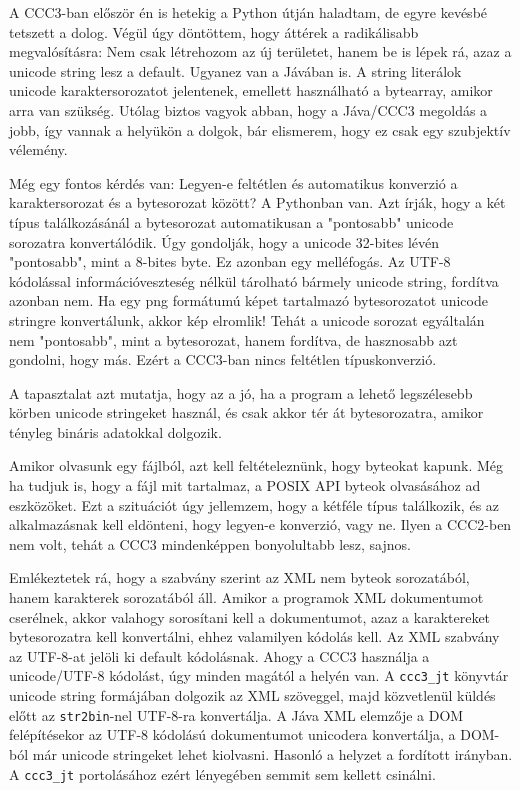 A CCC3-ban először én is hetekig a Python útján haladtam,
de egyre kevésbé tetszett a dolog. Végül úgy döntöttem,
hogy áttérek a radikálisabb megvalósításra: Nem csak létrehozom
az új területet, hanem be is lépek rá, azaz a unicode string
lesz a default. Ugyanez van a Jávában is. A string literálok
unicode karaktersorozatot jelentenek, emellett használható a
bytearray, amikor arra van szükség. Utólag biztos vagyok
abban, hogy a Jáva/CCC3 megoldás a jobb, így vannak a helyükön
a dolgok, bár elismerem, hogy ez csak egy szubjektív vélemény.

Még egy fontos kérdés van: Legyen-e feltétlen és automatikus
konverzió a karaktersorozat és a bytesorozat között?
A Pythonban van. Azt írják, hogy a két típus találkozásánál
a bytesorozat automatikusan a "pontosabb" unicode sorozatra
konvertálódik. Úgy gondolják, hogy a unicode 32-bites lévén
"pontosabb", mint a 8-bites byte. Ez azonban egy melléfogás.
Az UTF-8 kódolással információveszteség nélkül tárolható
bármely unicode string, fordítva azonban nem.
Ha egy png formátumú képet tartalmazó bytesorozatot
unicode stringre konvertálunk, akkor kép elromlik!
Tehát a unicode sorozat egyáltalán nem "pontosabb", 
mint a bytesorozat, hanem fordítva, de hasznosabb azt gondolni, 
hogy más. Ezért a CCC3-ban nincs feltétlen típuskonverzió.

A tapasztalat azt mutatja, hogy az a jó, ha a program 
a lehető legszélesebb körben unicode stringeket használ,
és csak akkor tér át bytesorozatra, amikor tényleg
bináris adatokkal dolgozik. 

Amikor olvasunk egy fájlból, azt kell feltételeznünk, hogy
byteokat kapunk. Még ha tudjuk is, hogy a fájl mit tartalmaz,
a POSIX API byteok olvasásához ad eszközöket. 
Ezt a szituációt úgy jellemzem, hogy a kétféle típus találkozik,
és az alkalmazásnak kell eldönteni, hogy legyen-e konverzió,
vagy ne. Ilyen a CCC2-ben nem volt, tehát a CCC3 mindenképpen
bonyolultabb lesz, sajnos.

Emlékeztetek rá, hogy a szabvány szerint az XML nem byteok
sorozatából, hanem karakterek sorozatából áll. Amikor a programok
XML dokumentumot cserélnek, akkor valahogy sorosítani kell
a dokumentumot, azaz a karaktereket bytesorozatra kell
konvertálni, ehhez valamilyen kódolás kell. Az XML szabvány 
az UTF-8-at jelöli ki default kódolásnak. Ahogy a CCC3 használja 
a unicode/UTF-8 kódolást, úgy minden magától a helyén van. 
A \verb!ccc3_jt! könyvtár unicode string formájában dolgozik az XML 
szöveggel, majd közvetlenül küldés előtt az \verb!str2bin!-nel 
UTF-8-ra konvertálja. A Jáva XML elemzője a DOM felépítésekor
az UTF-8 kódolású dokumentumot unicodera konvertálja, 
a DOM-ból már unicode stringeket lehet kiolvasni.
Hasonló a helyzet a fordított irányban.
A \verb!ccc3_jt! portolásához ezért lényegében semmit sem 
kellett csinálni.

